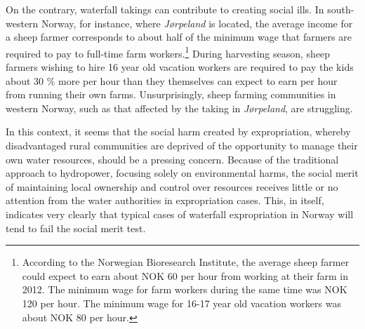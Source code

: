 On the contrary, waterfall takings can contribute to creating social ills. In south-western Norway, for instance, where {\it Jørpeland} is located, the average income for a sheep farmer corresponds to about half of the minimum wage that farmers are required to pay to full-time farm workers.\footnote{According to the Norwegian Bioresearch Institute, the average sheep farmer could expect to earn about NOK 60 per hour from working at their farm in 2012. The minimum wage for farm workers during the same time was NOK 120 per hour. The minimum wage for 16-17 year old vacation workers was about NOK 80 per hour.} During harvesting season, sheep farmers wishing to hire 16 year old vacation workers are required to pay the kids about 30 \% more per hour than they themselves can expect to earn per hour from running their own farms. Unsurprisingly, sheep farming communities in western Norway, such as that affected by the taking in {\it Jørpeland}, are struggling.

In this context, it seems that the social harm created by expropriation, whereby disadvantaged rural communities are deprived of the opportunity to manage their own water resources, should be a pressing concern. Because of the traditional approach to hydropower, focusing solely on environmental harms, the social merit of maintaining local ownership and control over resources receives little or no attention from the water authorities in expropriation cases. This, in itself, indicates very clearly that typical cases of waterfall expropriation in Norway will tend to fail the social merit test.

